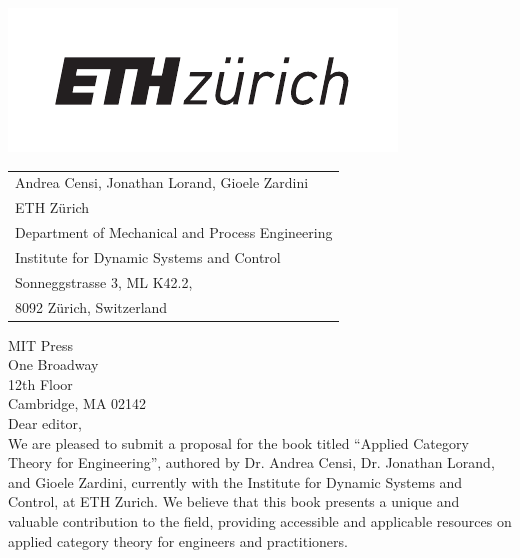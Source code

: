 \documentclass[10pt, article, one side]{memoir}
\begin{document}
    \begin{minipage}{0.45\linewidth}
        \includegraphics[width=0.9\linewidth]{pics/ethlogo.pdf}
        \vfill
    \end{minipage}
    \begin{minipage}{0.5\linewidth}
        \begin{flushright}
            \begin{tabular}{l}
                Andrea Censi, Jonathan Lorand, Gioele Zardini \\
                ETH Z\"urich \\
                Department of Mechanical and Process Engineering \\
                Institute for Dynamic Systems and Control \\
                Sonneggstrasse 3, ML K42.2, \\
                8092 Z\"urich, Switzerland
            \end{tabular}
        \end{flushright}
    \end{minipage}

    \vspace{1cm}

    \noindent MIT Press\\
    \noindent One Broadway\\
    \noindent 12th Floor \\
    \noindent Cambridge, MA 02142\\[+7pt]

    Dear editor,\\[-5pt]

    We are pleased to submit a proposal for the book titled ``Applied Category Theory for Engineering'', authored by Dr.
    Andrea Censi, Dr.
    Jonathan Lorand, and Gioele Zardini, currently with the Institute for Dynamic Systems and Control, at ETH Zurich.
    We believe that this book presents a unique and valuable contribution to the field, providing accessible and applicable resources on applied category theory for engineers and practitioners.
    \\[-7pt]
\end{document}
